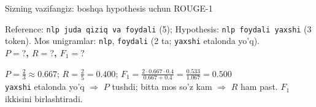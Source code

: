 \documentclass[aspectratio=169,11pt]{beamer}
\begin{document}
\begin{frame}{Sizning vazifangiz: boshqa hypothesis uchun ROUGE-1}
  \begin{tcolorbox}[warnbox,title=Savol --- 90 soniya]
    \small
    Reference: \texttt{nlp juda qiziq va foydali} (5); Hypothesis:
    \texttt{nlp foydali yaxshi} (3 token). Mos unigramlar: \texttt{nlp},
    \texttt{foydali} (2 ta; \texttt{yaxshi} etalonda yo'q).\\[4pt]
    \textbf{\large $P=?$, \; $R=?$, \; $F_1=?$}
  \end{tcolorbox}
  \pause
  \begin{tcolorbox}[okbox,title=Javob]
    \small
    $P=\tfrac{2}{3}\approx 0.667$; \; $R=\tfrac{2}{5}=0.400$; \;
    $F_1=\tfrac{2\cdot 0.667\cdot 0.4}{0.667+0.4}=\tfrac{0.533}{1.067}=\mathbf{0.500}$\\[3pt]
    \footnotesize \texttt{yaxshi} etalonda yo'q $\Rightarrow$ $P$ tushdi; bitta
    mos so'z kam $\Rightarrow$ $R$ ham past. $F_1$ ikkisini birlashtiradi.
  \end{tcolorbox}
\end{frame}
\end{document}
